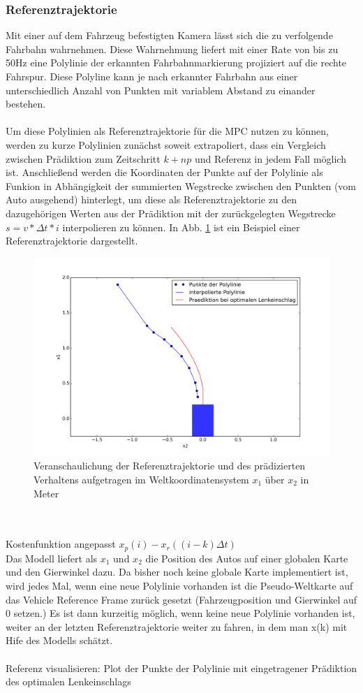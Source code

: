 \subsubsection{Referenztrajektorie}
Mit einer auf dem Fahrzeug befestigten Kamera lässt sich die zu verfolgende Fahrbahn wahrnehmen. Diese Wahrnehmung liefert mit einer Rate von bis zu 50Hz eine Polylinie der erkannten Fahrbahnmarkierung projiziert auf die rechte Fahrspur. Diese Polyline kann je nach erkannter Fahrbahn aus einer unterschiedlich Anzahl von Punkten mit variablem Abstand zu einander bestehen.\\ \\
Um diese Polylinien als Referenztrajektorie für die MPC nutzen zu können, werden zu kurze Polylinien zunächst soweit extrapoliert, dass ein Vergleich zwischen Prädiktion zum Zeitschritt $k+np$ und Referenz in jedem Fall möglich ist. Anschließend werden die Koordinaten der Punkte auf der Polylinie als Funkion in Abhängigkeit der summierten Wegstrecke zwischen den Punkten (vom Auto ausgehend) hinterlegt, um diese als Referenztrajektorie zu den dazugehörigen Werten aus der Prädiktion mit der zurückgelegten Wegstrecke $s = v*\Delta t*i$ interpolieren zu können. In Abb. \ref{fig:referenz} ist ein Beispiel einer Referenztrajektorie dargestellt.
\begin{figure}[t]
\centering
\includegraphics[scale=0.53]{Bilder/Reference.png}
\caption{Veranschaulichung der Referenztrajektorie und des prädizierten Verhaltens aufgetragen im Weltkoordinatensystem $x_1$ über $x_2$ in Meter}
\label{fig:referenz}
\end{figure}\\ \\
Kostenfunktion angepasst $x_p(i)-x_r((i-k)\Delta t)$\\
Das Modell liefert als $x_1$ und $x_2$ die Position des Autos auf einer globalen Karte und den Gierwinkel dazu. Da bisher noch keine globale Karte implementiert ist, wird jedes Mal, wenn eine neue Polylinie vorhanden ist die Pseudo-Weltkarte auf das Vehicle Reference Frame zurück gesetzt (Fahrzeugposition und Gierwinkel auf 0 setzen.) Es ist dann kurzeitig möglich, wenn keine neue Polylinie vorhanden ist, weiter an der letzten Referenztrajektorie weiter zu fahren, in dem man x(k) mit Hife des Modells schätzt.\\ \\
Referenz visualisieren: Plot der Punkte der Polylinie mit eingetragener Prädiktion des optimalen Lenkeinschlags
